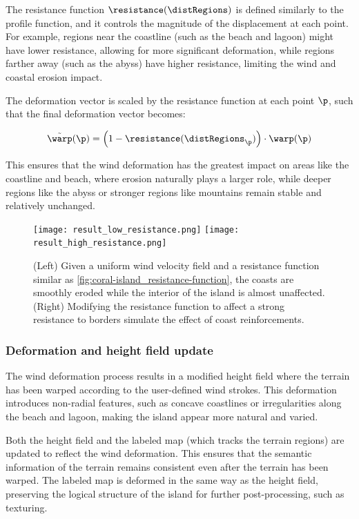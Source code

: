 The resistance function $\resistance(\distRegions)$ is defined similarly to the profile function, and it controls the magnitude of the displacement at each point. For example, regions near the coastline (such as the beach and lagoon) might have lower resistance, allowing for more significant deformation, while regions farther away (such as the abyss) have higher resistance, limiting the wind and coastal erosion impact.

The deformation vector is scaled by the resistance function at each point $\p$, such that the final deformation vector becomes:

\begin{align}
    \Tilde{\warp}(\p) = \left(1 - \resistance(\distRegions_\p) \right) \cdot \warp(\p)
\end{align}

This ensures that the wind deformation has the greatest impact on areas like the coastline and beach, where erosion naturally plays a larger role, while deeper regions like the abyss or stronger regions like mountains remain stable and relatively unchanged.

\begin{figure}[H]
    \texttt{[image: result\_low\_resistance.png]}
    \texttt{[image: result\_high\_resistance.png]}
    \caption{(Left) Given a uniform wind velocity field and a resistance function similar as \cref{fig:coral-island_resistance-function}, the coasts are smoothly eroded while the interior of the island is almost unaffected. (Right) Modifying the resistance function to affect a strong resistance to borders simulate the effect of coast reinforcements.}
\end{figure}

\subsubsection{Deformation and height field update}

The wind deformation process results in a modified height field where the terrain has been warped according to the user-defined wind strokes. This deformation introduces non-radial features, such as concave coastlines or irregularities along the beach and lagoon, making the island appear more natural and varied.

Both the height field and the labeled map (which tracks the terrain regions) are updated to reflect the wind deformation. This ensures that the semantic information of the terrain remains consistent even after the terrain has been warped. The labeled map is deformed in the same way as the height field, preserving the logical structure of the island for further post-processing, such as texturing.

